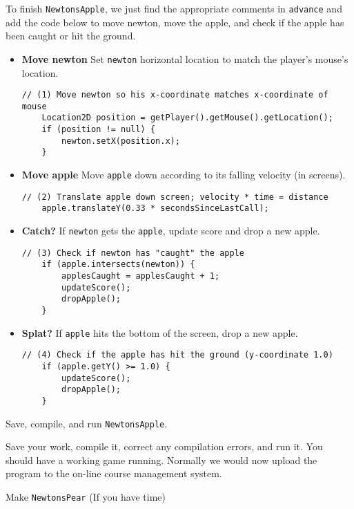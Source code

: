 \documentclass[12pt,twoside]{memoir}
\newcommand\code[1]{\lstinline^#1^}
\newcounter{ProgrammingProblem}
\newenvironment{LabExercises}{%
\renewcommand{\ExerciseListName}{Question}%
\renewcommand{\ExerciseListHeader}{\textbf{%
   Checkpoint\ExerciseHeaderNB. }}
\begin{ExerciseList}}%
{\end{ExerciseList}}
\newcommand{\LabExercise}{\Exercise[name={Lab Phase\ExerciseHeaderNB},counter={ProgrammingProblem}]}
\begin{document}
\begin{LabExercises}
To finish \code{NewtonsApple}, we just find the appropriate comments
in \code{advance} and add the code below to move newton, move the
apple, and check if the apple has been caught or hit the ground.

\begin{itemize}
\item \textbf{Move newton} Set \code{newton} horizontal location to
  match the player's mouse's location.
\begin{lstlisting}[numbers=none]    
	// (1) Move newton so his x-coordinate matches x-coordinate of mouse
	Location2D position = getPlayer().getMouse().getLocation();
	if (position != null) {
	    newton.setX(position.x);
	}
\end{lstlisting}

\item \textbf{Move apple} Move \code{apple} down according to its falling
  velocity (in screens).
\begin{lstlisting}[numbers=none]    
	// (2) Translate apple down screen; velocity * time = distance
	apple.translateY(0.33 * secondsSinceLastCall);
\end{lstlisting}

\item \textbf{Catch?} If \code{newton} gets the \code{apple}, update
  score and drop a new apple.
\begin{lstlisting}[numbers=none]    
	// (3) Check if newton has "caught" the apple
	if (apple.intersects(newton)) {
	    applesCaught = applesCaught + 1; 
	    updateScore();
	    dropApple();
	}
\end{lstlisting}

\item \textbf{Splat?} If \code{apple} hits the bottom of the screen,
  drop a new apple.
\begin{lstlisting}[numbers=none]    
	// (4) Check if the apple has hit the ground (y-coordinate 1.0)
	if (apple.getY() >= 1.0) {
	    updateScore();
	    dropApple();
	}
\end{lstlisting}
\end{itemize}

\LabExercise Save, compile, and run \texttt{NewtonsApple}.

Save your work, compile it, correct any compilation errors, and run
it. You should have a working game running.  Normally we would now
upload the program to the on-line course management system.

\LabExercise Make \texttt{NewtonsPear} (If you have time)


\end{LabExercises}
\end{document}
